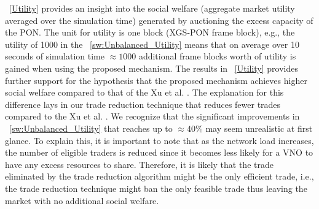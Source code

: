 \figureautorefname~\ref{Utility} provides an insight into the social welfare (aggregate market utility averaged over the simulation time) generated by auctioning the excess capacity of the PON. The unit for utility is one block (XGS-PON frame block), e.g., the utility of 1000 in the \figureautorefname~\ref{sw:Unbalanced_Utility} means that on average over 10 seconds of simulation time $\approx1000$ additional frame blocks worth of utility is gained when using the proposed mechanism. The results in \figureautorefname~\ref{Utility} provides further support for the hypothesis that the proposed mechanism achieves higher social welfare compared to that of the Xu et al. \cite{5462277}. The explanation for this difference lays in our trade reduction technique that reduces fewer trades compared to the Xu et al. \cite{5462277}. We recognize that the significant improvements in \figureautorefname~\ref{sw:Unbalanced_Utility} that reaches up to $\approx 40\%$ may seem unrealistic at first glance. To explain this, it is important to note that as the network load increases, the number of eligible traders is reduced since it becomes less likely for a \ac{VNO} to have any excess resources to share. Therefore, it is likely that the trade eliminated by the trade reduction algorithm might be the only efficient trade, i.e., the trade reduction technique might ban the only feasible trade thus leaving the market with no additional social welfare.


